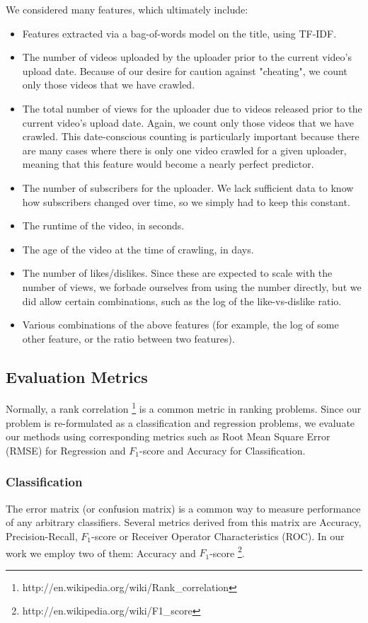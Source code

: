 		We considered many features, which ultimately include:
		\begin{itemize}
			\item
			Features extracted via a bag-of-words model on the title, using TF-IDF.
			\item
			The number of videos uploaded by the uploader prior to the current video's upload date.  Because of our desire for caution against "cheating", we count only those videos that we have crawled.
			\item
			The total number of views for the uploader due to videos released prior to the current video's upload date.  Again, we count only those videos that we have crawled.  This date-conscious counting is particularly important because there are many cases where there is only one video crawled for a given uploader, meaning that this feature would become a nearly perfect predictor.
			\item
			The number of subscribers for the uploader.  We lack sufficient data to know how subscribers changed over time, so we simply had to keep this constant.
			\item
			The runtime of the video, in seconds.
			\item
			The age of the video at the time of crawling, in days.
			\item
			The number of likes/dislikes.  Since these are expected to scale with the number of views, we forbade ourselves from using the number directly, but we did allow certain combinations, such as the log of the like-vs-dislike ratio.
			\item
			Various combinations of the above features (for example, the log of some other feature, or the ratio between two features).
		\end{itemize}
	
\subsection{Evaluation Metrics}
	Normally, a rank correlation \footnote{http://en.wikipedia.org/wiki/Rank\_correlation} is a common metric in ranking problems. Since our problem is re-formulated as a classification and regression problems, we evaluate our methods using corresponding metrics such as Root Mean Square Error (RMSE) for Regression and $F_1$-score and Accuracy for Classification.
	
	\subsubsection{Classification}
	The error matrix (or confusion matrix) is a common way to measure performance of any arbitrary classifiers. Several metrics derived from this matrix are Accuracy, Precision-Recall, $F_1$-score or Receiver Operator Characteristics (ROC). In our work we employ two of them: Accuracy and $F_1$-score \footnote{http://en.wikipedia.org/wiki/F1\_score}.
	
